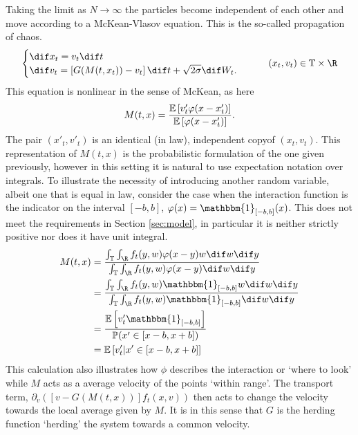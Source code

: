  Taking the limit as $N\to \infty$ the particles become independent of each other and move according to a McKean-Vlasov equation. This is the so-called propagation of chaos.
  \begin{equation}\label{eq:McKV}\begin{cases}
        \dif x_t = v_t\dif t\\
        \dif v_t = \left[G(M(t,x_t))-v_t\right] \dif t + \sqrt{2\sigma} \dif W_t. 
        \end{cases} \qquad  (x_t,v_t) \in \T \times \R
  \end{equation}
  This equation is nonlinear in the sense of McKean, as here 
  \[
    M(t,x) = \frac{\mathbb{E}\left[ v'_t \varphi(x-x'_t)\right]}{\mathbb{E}\left[\varphi(x-x'_t)\right]}.
  \]
  The pair $(x'_t,v'_t)$ is an identical (in law), independent copyof $(x_t,v_t)$. This representation of $M(t,x)$ is the probabilistic formulation of the one given previously, however in this setting it is natural to use expectation notation over integrals. To illustrate the necessity of introducing another random variable, albeit one that is equal in law, consider the case when the interaction function is the indicator on the interval $[-b,b]$, $\phi(x) = \mathbbm{1}_{[-b,b]}(x)$. This does not meet the requirements in Section \ref{sec:model}, in particular it is neither strictly positive nor does it have unit integral. 
  \begin{align*}
  M(t,x) &=  \frac{\int_{\T}\int_{\R}f_t(y,w)\phi(x-y)w\dif w \dif y}{\int_{\T}\int_{\R}f_t(y,w)\phi(x-y)\dif w \dif y}\\
  &=  \frac{\int_{\T}\int_{\R}f_t(y,w) \mathbbm{1}_{[-b,b]}w\dif w \dif y}{\int_{\T}\int_{\R}f_t(y,w) \mathbbm{1}_{[-b,b]}\dif w \dif y}\\
  &= \frac{\E\left[ v'_t \mathbbm{1}_{[-b,b]}\right]}{\P(x' \in \left[x-b,x+b\right])}\\
  &= \E\left[ v'_t|x' \in [x-b,x+b] \right]
  \end{align*}
  This calculation also illustrates how $\phi$ describes the interaction or `where to look' while $M$ acts as a average velocity of the points `within range'. The transport term, $\partial_v\left( \left[ v-G(M(t,x))\right]f_t(x,v)\right)$ then acts to change the velocity towards the local average given by $M$. It is in this sense that $G$ is the herding function `herding' the system towards a common velocity.

